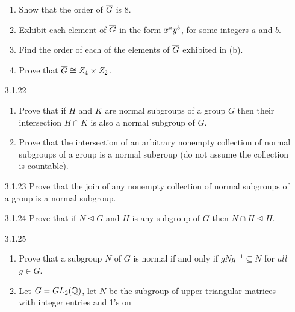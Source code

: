 \begin{enumerate}
                  \begin{enumerate}
                     \item Show that the order of $\overline{G}$ is 8.
                     \item Exhibit each element of $\overline{G}$ in the form
                           $\overline{x}^a\overline{y}^b$, for some integers $a$ and $b$.
                     \item Find the order of each of the elements of $\overline{G}$
                           exhibited in (b).
                     \item Prove that $\overline{G} \cong Z_4 \times Z_2$.
                  \end{enumerate}
   \item[3.1.22]  \begin{enumerate}
                     \item Prove that if $H$ and $K$ are normal subgroups of a
                           group $G$ then their intersection $H \cap K$ is also
                           a normal subgroup of $G$.
                     \item Prove that the intersection of an arbitrary nonempty
                           collection of normal subgroups of a group is a normal
                           subgroup (do not assume the collection is countable).
                  \end{enumerate}
   \item[3.1.23]  Prove that the join of any nonempty collection of normal
                  subgroups of a group is a normal subgroup.
   \item[3.1.24]  Prove that if $N \trianglelefteq G$ and $H$ is any subgroup of
                  $G$ then $N \cap H \trianglelefteq H$.
   \item[3.1.25]  \begin{enumerate}
                     \item Prove that a subgroup $N$ of $G$ is normal if and
                           only if $gNg^{-1} \subseteq N$ for \textit{all}
                           $g \in G$.
                     \item Let $G = GL_2(\mathbb{Q})$, let $N$ be the subgroup of upper
                           triangular matrices with integer entries and 1's on

\end{enumerate}
\end{enumerate}
